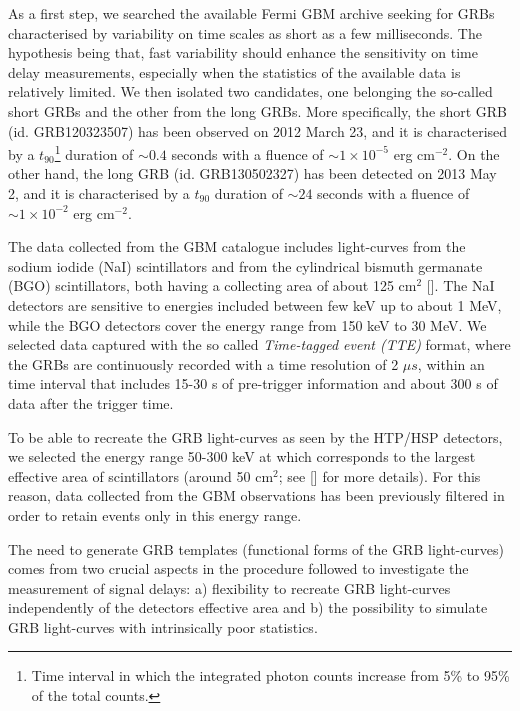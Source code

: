 \documentclass[]{spie}  %
\def \us{$\mu s$\xspace}
\begin{document}
As a first step, we searched the available Fermi GBM archive seeking for GRBs characterised by variability on time scales as short as a few milliseconds. The hypothesis being that, fast variability should enhance the sensitivity on time delay measurements, especially when the statistics of the available data is relatively limited. We then isolated two candidates, one belonging the so-called short GRBs and the other from the long GRBs. More specifically, the short GRB (id. GRB120323507) has been observed on 2012 March 23, and it is characterised by a $t_{90}$\footnote{Time interval in which the integrated photon counts increase from 5\% to 95\% of the total counts.} duration of $\sim0.4$ seconds with a fluence of $\sim1\times10^{-5}$ erg cm$^{-2}$. On the other hand, the long GRB (id. GRB130502327) has been detected on 2013 May 2, and it is characterised by a $t_{90}$ duration of $\sim24$ seconds with a fluence of $\sim1\times10^{-2}$ erg cm$^{-2}$.

The data collected from the GBM catalogue includes light-curves from the sodium iodide (NaI) scintillators and from the cylindrical bismuth germanate (BGO) scintillators, both having a collecting area of about 125 cm$^2$ []. The NaI detectors are sensitive to energies included between few keV up to about 1 MeV, while the BGO detectors cover the energy range from 150 keV to 30 MeV. We selected data captured with the so called \textit{Time-tagged event (TTE)} format, where the GRBs are continuously recorded with a time resolution of 2 \us, within an time interval that includes 15-30 s of pre-trigger information and about 300 s of data after the trigger time.

To be able to recreate the GRB light-curves as seen by the HTP/HSP detectors, we selected the energy range 50-300 keV at which corresponds to the largest effective area of scintillators (around 50 cm$^2$; see [] for more details). For this reason, data collected from the GBM observations has been previously filtered in order to retain events only in this energy range.

The need to generate GRB templates (functional forms of the GRB light-curves) comes from two crucial aspects in the procedure followed to investigate the measurement of signal delays: a) flexibility to recreate GRB light-curves independently of the detectors effective area and b) the possibility to simulate GRB light-curves with intrinsically poor statistics.  
\end{document}
